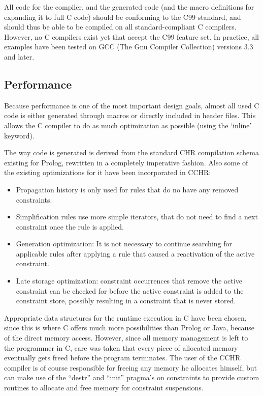 \documentclass{llncs}
\begin{document}
All code for the compiler, and the generated code (and the macro definitions for expanding it to full C code) should be conforming to the C99 standard,
and should thus be able to be compiled on all standard-compliant C compilers. However, no C compilers exist yet that accept
the C99 feature set. In practice, all examples have been tested on GCC (The Gnu Compiler Collection) versions 3.3 and later.

\subsection{Performance}

Because performance is one of the most important design goals, almost all used C code is either generated through macros
or directly included in header files. This allows the C compiler to do as much optimization as possible (using the `inline'
keyword).

The way code is generated is derived from the standard CHR compilation schema existing for Prolog, rewritten in a completely
imperative fashion. Also some of the existing optimizations for it have been incorporated in CCHR: \begin{itemize}
  \item Propagation history is only used for rules that do no have any removed constraints.
  \item Simplification rules use more simple iterators, that do not need to find a next constraint once the rule is applied.
  \item Generation optimization: It is not necessary to continue searching for applicable rules after applying a rule that caused a reactivation of the active constraint.
  \item Late storage optimization: constraint occurrences that remove the active constraint can be checked for before the active constraint is added to the constraint store, possibly resulting in a constraint that is never stored.
\end{itemize}

Appropriate data structures for the runtime execution in C have been chosen, since this is where C offers much more
possibilities than Prolog or Java, because of the direct memory access. However, since all memory management is left to
the programmer in C, care was taken that every piece of allocated memory eventually gets freed before the program terminates.
The user of the CCHR compiler is of course responsible for freeing any memory he allocates himself, but can make use of the
``destr'' and ``init'' pragma's on constraints to provide custom routines to allocate and free memory for constraint suspensions.
\end{document}
